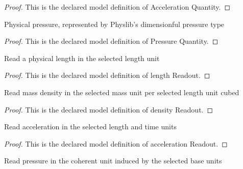 \begin{proof}
  This is the declared model definition of Acceleration Quantity.
\end{proof}
\begin{definition}
  \label{def:physics:phyx-mini-0393:phyxminiproblems-problemphyxmini0393-pressurequantity}
  Physical pressure, represented by Physlib's dimensionful pressure type
\end{definition}
\begin{proof}
  This is the declared model definition of Pressure Quantity.
\end{proof}
\begin{definition}
  \label{def:physics:phyx-mini-0393:phyxminiproblems-problemphyxmini0393-lengthreadout}
  Read a physical length in the selected length unit
\end{definition}
\begin{proof}
  This is the declared model definition of length Readout.
\end{proof}
\begin{definition}
  \label{def:physics:phyx-mini-0393:phyxminiproblems-problemphyxmini0393-densityreadout}
  Read mass density in the selected mass unit per selected length unit cubed
\end{definition}
\begin{proof}
  This is the declared model definition of density Readout.
\end{proof}
\begin{definition}
  \label{def:physics:phyx-mini-0393:phyxminiproblems-problemphyxmini0393-accelerationreadout}
  Read acceleration in the selected length and time units
\end{definition}
\begin{proof}
  This is the declared model definition of acceleration Readout.
\end{proof}
\begin{definition}
  \label{def:physics:phyx-mini-0393:phyxminiproblems-problemphyxmini0393-pressurereadout}
  Read pressure in the coherent unit induced by the selected base units
\end{definition}

